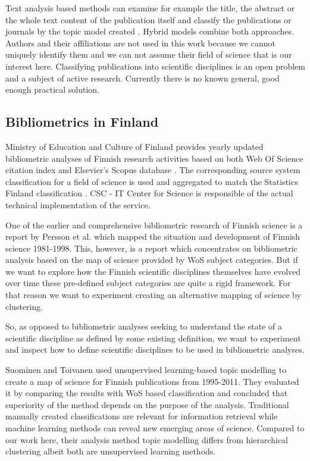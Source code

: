 Text analysis based methods can examine for example the title, the 
abstract or the whole text content of the publication itself and 
classify the publications or journals by the topic model created 
\cite{blei_latent_2003}.
Hybrid models combine both approaches. 
Authors and their affiliations are not used in this work because 
we cannot uniquely identify them and we can not assume their field 
of science that is our interest here.
Classifying publications into scientific disciplines is an open
problem and a subject of active research. Currently there is no 
known general, good enough practical solution.


\subsection{Bibliometrics in Finland}
Ministry of Education and Culture of Finland provides yearly
updated bibliometric analyses of Finnish research activities 
based on both Web Of Science citation index 
and Elsevier's Scopus database \cite[Vipunen 
service]{noauthor_ministry_2020}. The corresponding source 
system classification for a field of science is used and
aggregated to match the Statistics Finland classification 
\cite{auranen_tieteen_2018}. CSC - 
IT Center for Science is responsible of the actual technical 
implementation of the service.

One of the earlier and comprehensive bibliometric research of 
Finnish science is a report by Persson et al. 
\cite{persson_bibliometric_2000} which mapped the situation and 
development of Finnish science 1981-1998.
This, however, is a report which concentrates on bibliometric 
analysis based on the map of science provided by WoS subject 
categories. But if we want to explore how the Finnish scientific 
disciplines themselves have evolved over time these pre-defined 
subject categories are quite a rigid framework. For that reason we 
want to experiment creating an alternative mapping of science by 
clustering. 

So, as opposed to bibliometric analyses seeking to understand the
state of a scientific discipline as defined by some existing 
definition, we want to experiment and inspect how to define 
scientific disciplines to be used in bibliometric analyses.


Suominen and Toivanen \cite{suominen_map_2016} used unsupervised learning-based topic 
modelling to create a map of science for Finnish publications from 
1995-2011. They evaluated it by comparing the results with WoS 
based classification and concluded that superiority of the method
depends on the purpose of the analysis. Traditional manually created 
classifications are relevant for information retrieval while 
machine learning methods can reveal new emerging areas of science.
Compared to our work here, their 
analysis method topic modelling differs from hierarchical 
clustering albeit both are unsupervised learning methods.


